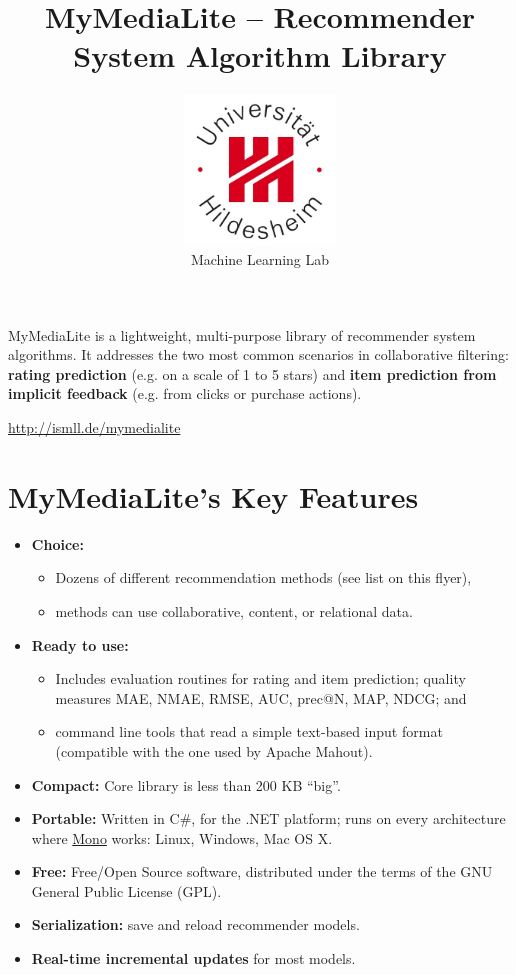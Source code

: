 \documentclass[a4paper, foldmark, 12pt]{leaflet}
\title{MyMediaLite -- Recommender System Algorithm Library}
\author{
	\includegraphics[width=4.0cm]{fig/uni-hildesheim-400x400.jpg}\\
	Machine Learning Lab
}
\date{}
\begin{document}
\maketitle

MyMediaLite is a lightweight, multi-purpose library
of recommender system algorithms.
It addresses the two most common scenarios in collaborative filtering:
\textbf{rating prediction} (e.g. on a scale of 1 to 5 stars)
and \textbf{item prediction from implicit feedback} (e.g. from clicks or purchase actions).

\begin{center}
	\url{http://ismll.de/mymedialite}
\end{center}

\newpage

\section{MyMediaLite's Key Features}


\begin{itemize}
	\item \textbf{Choice:}
		\begin{itemize}
			\item Dozens of different recommendation methods (see list on this flyer),
			\item methods can use collaborative, content, or relational data.
		\end{itemize}
	\item \textbf{Ready to use:}
		\begin{itemize}
			\item Includes evaluation routines for rating and item prediction;
			      quality measures MAE, NMAE, RMSE, AUC, prec@N, MAP, NDCG; and
			\item command line tools that read a simple text-based input format
                              (compatible with the one used by Apache Mahout).
		\end{itemize}
	\item \textbf{Compact:} Core library is less than 200 KB ``big''.
	\item \textbf{Portable:} Written in C\#, for the .NET platform;
	      runs on every architecture where \href{www.mono-project.com}{Mono} works:
	      Linux, Windows, Mac OS X.
	\item \textbf{Free:} Free/Open Source software, distributed under the terms of the
	      GNU General Public License (GPL).
	\item \textbf{Serialization:} save and reload recommender models.
	\item \textbf{Real-time incremental updates} for most models.
\end{itemize}
\end{document}
